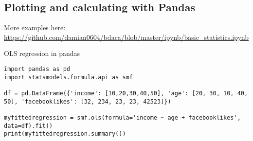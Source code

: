 \documentclass[compress]{beamer}
\begin{document}
\subsection{Plotting and calculating with Pandas}


\begin{frame}{}

More examples here: \url{https://github.com/damian0604/bdaca/blob/master/ipynb/basic_statistics.ipynb}
\end{frame}


\begin{frame}[fragile]{OLS regression in pandas}
\begin{lstlisting}
import pandas as pd
import statsmodels.formula.api as smf 

df = pd.DataFrame({'income': [10,20,30,40,50], 'age': [20, 30, 10, 40, 50], 'facebooklikes': [32, 234, 23, 23, 42523]})

myfittedregression = smf.ols(formula='income ~ age + facebooklikes', data=df).fit()
print(myfittedregression.summary())
\end{lstlisting}
	
\end{frame}
\end{document}
